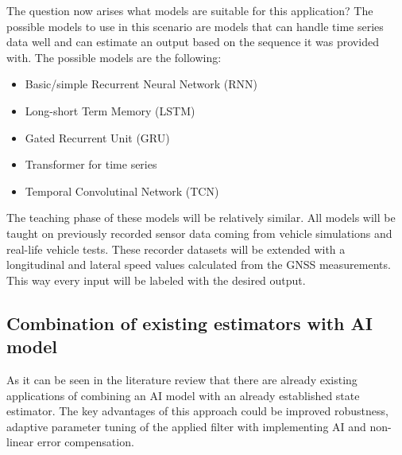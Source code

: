 The question now arises what models are suitable for this application? The possible models to use in this scenario are models that can handle time series data well and can estimate an output based on the sequence it was provided with. The possible models are the following:
\begin{itemize}
    \item Basic/simple Recurrent Neural Network (RNN)
    \item Long-short Term Memory (LSTM)
    \item Gated Recurrent Unit (GRU)
    \item Transformer for time series
    \item Temporal Convolutinal Network (TCN)
\end{itemize}

The teaching phase of these models will be relatively similar. All models will be taught on previously recorded sensor data coming from vehicle simulations and real-life vehicle tests. These recorder datasets will be extended with a longitudinal and lateral speed values calculated from the GNSS measurements. This way every input will be labeled with the desired output.

\subsection{Combination of existing estimators with AI model}

As it can be seen in the literature review that there are already existing applications of combining an AI model with an already established state estimator. The key advantages of this approach could be improved robustness, adaptive parameter tuning of the applied filter with implementing AI and non-linear error compensation.

